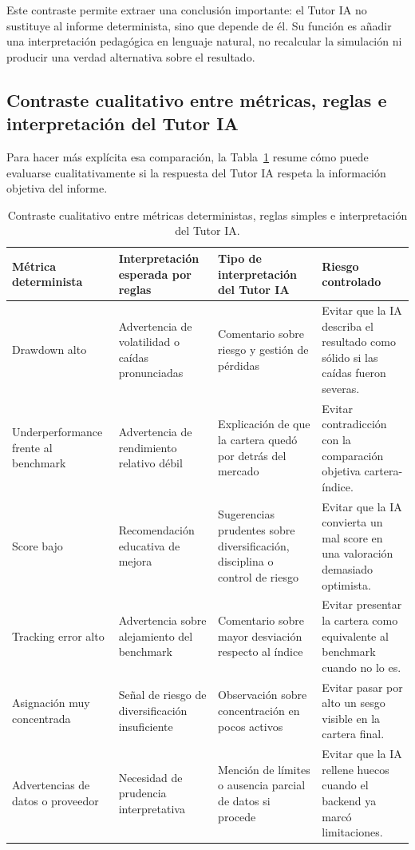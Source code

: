 Este contraste permite extraer una conclusión importante: el Tutor IA no sustituye al informe determinista, sino que depende de él. Su función es añadir una interpretación pedagógica en lenguaje natural, no recalcular la simulación ni producir una verdad alternativa sobre el resultado.

\subsection{Contraste cualitativo entre métricas, reglas e interpretación del Tutor IA}

Para hacer más explícita esa comparación, la Tabla~\ref{tab:metricas-reglas-tutor-ia} resume cómo puede evaluarse cualitativamente si la respuesta del Tutor IA respeta la información objetiva del informe.

\begin{table}[htbp]
\centering
\small
\renewcommand{\arraystretch}{1.15}
\begin{tabular}{|p{}|p{}|p{}|p{}|}
\hline
\textbf{Métrica determinista} & \textbf{Interpretación esperada por reglas} & \textbf{Tipo de interpretación del Tutor IA} & \textbf{Riesgo controlado} \\ \hline
Drawdown alto & Advertencia de volatilidad o caídas pronunciadas & Comentario sobre riesgo y gestión de pérdidas & Evitar que la IA describa el resultado como sólido si las caídas fueron severas. \\ \hline
Underperformance frente al benchmark & Advertencia de rendimiento relativo débil & Explicación de que la cartera quedó por detrás del mercado & Evitar contradicción con la comparación objetiva cartera-índice. \\ \hline
Score bajo & Recomendación educativa de mejora & Sugerencias prudentes sobre diversificación, disciplina o control de riesgo & Evitar que la IA convierta un mal score en una valoración demasiado optimista. \\ \hline
Tracking error alto & Advertencia sobre alejamiento del benchmark & Comentario sobre mayor desviación respecto al índice & Evitar presentar la cartera como equivalente al benchmark cuando no lo es. \\ \hline
Asignación muy concentrada & Señal de riesgo de diversificación insuficiente & Observación sobre concentración en pocos activos & Evitar pasar por alto un sesgo visible en la cartera final. \\ \hline
Advertencias de datos o proveedor & Necesidad de prudencia interpretativa & Mención de límites o ausencia parcial de datos si procede & Evitar que la IA rellene huecos cuando el backend ya marcó limitaciones. \\ \hline
\end{tabular}
\caption{Contraste cualitativo entre métricas deterministas, reglas simples e interpretación del Tutor IA.}
\label{tab:metricas-reglas-tutor-ia}
\end{table}

